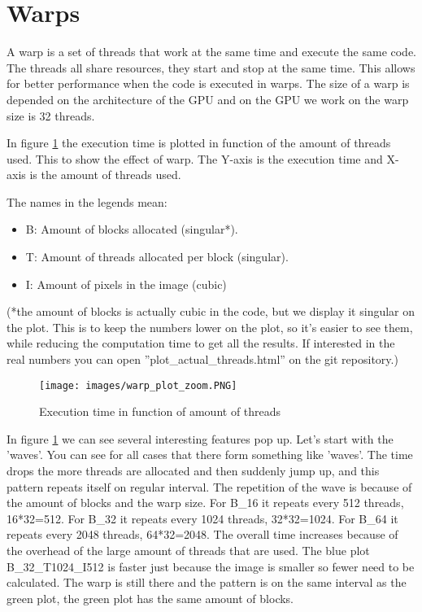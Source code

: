 \newpage

\section{Warps}
\label{sec:warps}

A warp is a set of threads that work at the same time and execute the same code. The threads all share resources, they start and stop at the same time. This allows for better performance when the code is executed in warps. The size of a warp is depended on the architecture of the GPU and on the GPU we work on the warp size is 32 threads.

In figure \ref{figure:warp_zoom} the execution time is plotted in function of the amount of threads used. This to show the effect of warp. The Y-axis is the execution time and X-axis is the amount of threads used.

The names in the legends mean:
\begin{itemize}
    \item B: Amount of blocks allocated (singular*).
    \item T: Amount of threads allocated per block (singular).\
    \item I: Amount of pixels in the image (cubic)
\end{itemize}
(*the amount of blocks is actually cubic in the code, but we display it singular on the plot. This is to keep the numbers lower on the plot, so it's easier to see them, while reducing the computation time to get all the results. If interested in the real numbers you can open ''plot\_actual\_threads.html'' on the git repository.)

\begin{figure}[H]
    \centering
    \texttt{[image: images/warp\_plot\_zoom.PNG]}
    \caption{Execution time in function of amount of threads}
    \label{figure:warp_zoom}
\end{figure}

In figure \ref{figure:warp_zoom} we can see several interesting features pop up. Let's start with the 'waves'. You can see for all cases that there form something like 'waves'. The time drops the more threads are allocated and then suddenly jump up, and this pattern repeats itself on regular interval. 
The repetition of the wave is because of the amount of blocks and the warp size. For B\_16 it repeats every 512 threads, 16*32=512. For B\_32 it repeats every 1024 threads, 32*32=1024. For B\_64 it repeats every 2048 threads, 64*32=2048. 
The overall time increases because of the overhead of the large amount of threads that are used.
The blue plot B\_32\_T1024\_I512 is faster just because the image is smaller so fewer need to be calculated. The warp is still there and the pattern is on the same interval as the green plot, the green plot has the same amount of blocks.


